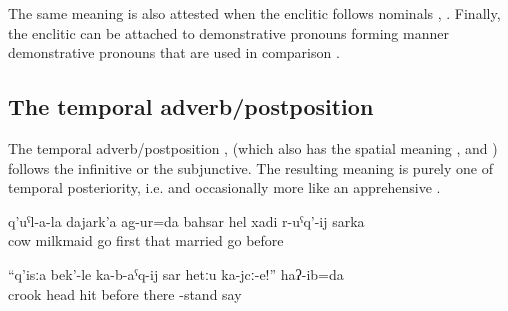 The same meaning is also attested when the enclitic follows nominals , . Finally, the enclitic can be attached to demonstrative pronouns forming manner demonstrative pronouns that are used in comparison  .
%




\subsection{The temporal adverb/postposition  }
\label{sec:enclitic =sarka}

The temporal adverb/postposition  , (which also has the spatial meaning ,  and ) follows the infinitive or the subjunctive. The resulting meaning is purely one of temporal posteriority, i.e.   and occasionally more like an apprehensive .
%
\begin{exe}
	\ex	\label{ex:‎I was a milkmaid until / before I got married}
	\gll	q'uˁl-a-la	dajark'a	ag-ur=da	bahsar	hel	xadi	r-uˁq'-ij	sarka\\
		cow	milkmaid	go	first	that	married go		before\\
	\glt	{}

	\ex	\label{ex:‎‎‎Stand there before / lest / otherwise I hit you with the crook on the head}
	\gll	``q'isːa	bek'-le	ka-b-aˁq-ij	sar	hetːu	ka-jcː-e!''	haʔ-ib=da\\
		crook	head	hit	before	there	-stand	say\\
	\glt	{}
\end{exe}



